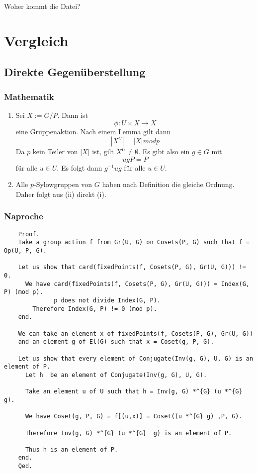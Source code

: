 \documentclass[a4paper,12pt]{scrartcl}
\begin{document}
Woher kommt die Datei?

\section{Vergleich}


\newpage

\subsection{Direkte Gegenüberstellung}


\subsubsection{Mathematik}
	\begin{enumerate}
	\item Sei $X := G/P$. Dann ist $$\phi: U \times X \rightarrow X$$ eine Gruppenaktion. Nach einem Lemma gilt dann $$|X^U| = |X| mod p$$ Da $p$ kein Teiler von $|X|$ ist, gilt $X^U \neq \emptyset$. Es gibt also ein $g \in G$ mit $$ugP = P$$ für alle $u \in U$. Es folgt dann $g^{-1}ug$ für alle $u \in U$. 
	\item Alle  $p$-Sylowgruppen von $G$ haben nach Definition die gleiche Ordnung. Daher folgt aus (ii) direkt (i).
	\end{enumerate}



	\subsubsection{Naproche}

	\begin{lstlisting}
	Proof.
	Take a group action f from Gr(U, G) on Cosets(P, G) such that f = Op(U, P, G).
	  
	Let us show that card(fixedPoints(f, Cosets(P, G), Gr(U, G))) !=  0.
	  We have card(fixedPoints(f, Cosets(P, G), Gr(U, G))) = Index(G, P) (mod p).
			  p does not divide Index(G, P).
		Therefore Index(G, P) != 0 (mod p).
	end.
	  
	We can take an element x of fixedPoints(f, Cosets(P, G), Gr(U, G))
	and an element g of El(G) such that x = Coset(g, P, G).
	  
	Let us show that every element of Conjugate(Inv(g, G), U, G) is an element of P.
	  Let h  be an element of Conjugate(Inv(g, G), U, G).
	
	  Take an element u of U such that h = Inv(g, G) *^{G} (u *^{G}  g).
	
 	  We have Coset(g, P, G) = f[(u,x)] = Coset((u *^{G} g) ,P, G).
	
	  Therefore Inv(g, G) *^{G} (u *^{G}  g) is an element of P.
	
	  Thus h is an element of P.
	end.
	Qed.
	\end{lstlisting}
\end{document}
